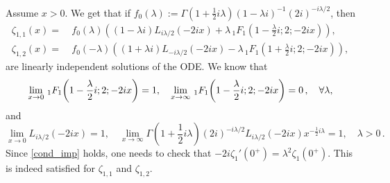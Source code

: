 \documentclass[%
 aip,
 jmp,%
 amsmath,amssymb,
 reprint,%
]{revtex4-2}
\begin{document}
Assume $x>0$. We get that if $f_0(\lambda):= \Gamma(1+\frac12i\lambda)  (1-\lambda i)^{-1}(2i)^{-i\lambda/2}$, then
\begin{equation}\label{eq:sol-zeta1(x)_xpos}
\begin{aligned}
\zeta_{1,1}(x)= &~{} f_0(\lambda) \left(  (1-\lambda i)  L_{i \lambda/2}(-2 i x)+  \lambda \, _1F_1\left(1- \frac{\lambda}2 i ;2;-2 i x \right) \right),\\
\zeta_{1,2}(x)=  &~{}  f_0(-\lambda) \left( (1+ \lambda i)L_{-i \lambda/2}(-2 i x) - \lambda \, _1F_1\left(1+  \frac{\lambda}2i ;2;-2 i x \right)\right),
\end{aligned}
\end{equation}
are linearly independent solutions of the ODE. We know that
\begin{equation*}
    \lim_{x\to 0}\,_1F_1\qty(1-\frac{\lambda}{2}i;2;-2ix)=1, \quad  \lim_{x\to\infty}\,_1F_1\qty(1-\frac{\lambda}{2}i;2;-2ix)=0\,, \quad \forall \lambda,
\end{equation*}
and
\begin{equation*}
    \lim_{x\to 0}L_{i\lambda/2}(-2ix)=1,\quad   \lim_{x\to\infty} \Gamma(1+\frac12i\lambda) (2i)^{-i\lambda/2} L_{i\lambda/2}(-2ix) x^{-\frac12i\lambda}=1,\quad \lambda>0\,.
\end{equation*}
Since \eqref{cond_imp} holds, one needs to check that $-2i \zeta_1'(0^+) = \lambda^2 \zeta_1(0^+)$. This is indeed satisfied for $\zeta_{1,1}$ and $\zeta_{1,2}$.

%
\end{document}
